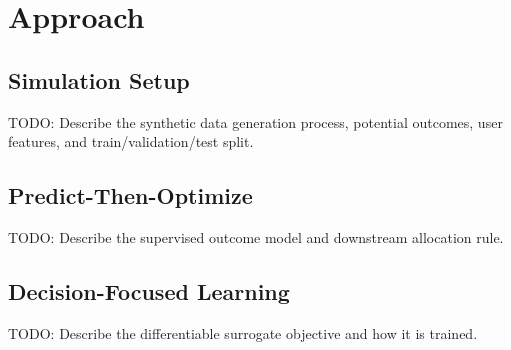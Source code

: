 \section{Approach}

\subsection{Simulation Setup}
TODO: Describe the synthetic data generation process, potential outcomes, user features, and train/validation/test split.

\subsection{Predict-Then-Optimize}
TODO: Describe the supervised outcome model and downstream allocation rule.

\subsection{Decision-Focused Learning}
TODO: Describe the differentiable surrogate objective and how it is trained.
